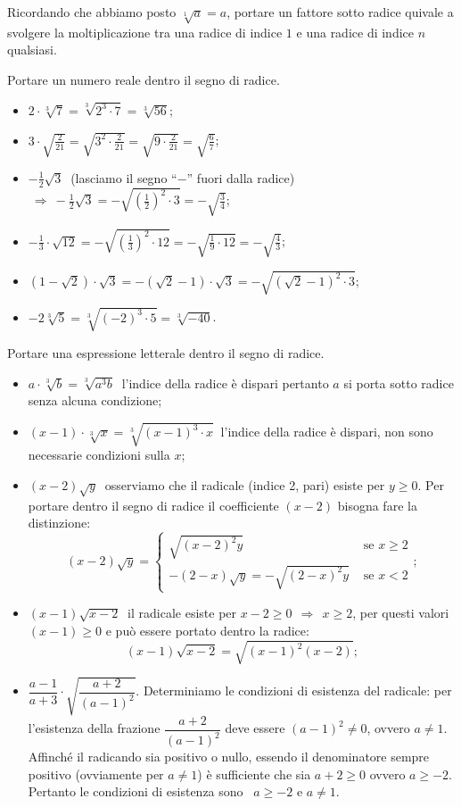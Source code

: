 Ricordando che abbiamo posto $\sqrt[1]a=a$, portare un fattore sotto radice quivale a svolgere la moltiplicazione tra una radice di indice $1$ e una radice di indice $n$ qualsiasi.
\begin{exrig}
 \begin{esempio}
 Portare un numero reale dentro il segno di radice.
 \begin{itemize}
 \item $2\cdot \sqrt[3]7=\sqrt[3]{2^3\cdot 7}=\sqrt[3]{56}$;
 \item $3\cdot \sqrt{\frac 2{21}}=\sqrt{3^2\cdot \frac 2{21}}=\sqrt{9\cdot \frac 2{21}}=\sqrt{\frac 6 7}$;
 \item $-\frac 1 2\sqrt 3\:$ (lasciamo il segno ``$-$'' fuori dalla radice) $\:\Rightarrow\:-\frac 1 2\sqrt 3=-\sqrt{\left(\frac 1 2\right)^2\cdot 3}=-\sqrt{\frac 3 4}$;
 \item $-\frac 1 3\cdot \sqrt{12}=-\sqrt{\left(\frac 1 3\right)^2\cdot 12}=-\sqrt{\frac 1 9\cdot 12}=-\sqrt{\frac 4 3}$;
 \item $\left(1-\sqrt 2\right)\cdot \sqrt 3=-	\left(\sqrt 2-1\right)\cdot \sqrt 3=-\sqrt{(\sqrt 2-1)^2\cdot 3}$;
 \item $-2\sqrt[3]5=\sqrt[3]{(-2)^3\cdot 5}=\sqrt[3]{-40}$.
 \end{itemize}
 \end{esempio}

 \begin{esempio}
 Portare una espressione letterale dentro il segno di radice.
 \begin{itemize}
 \item $a\cdot \sqrt[3]b=\sqrt[3]{a^3b}\:$ l'indice della radice è dispari pertanto $a$ si porta sotto radice senza alcuna condizione;
 \item $(x-1)\cdot \sqrt[3]x=\sqrt[3]{(x-1)^3\cdot x}\:$ l'indice della radice è dispari, non sono necessarie condizioni sulla $x$;
 \item $(x-2)\sqrt y\:$ osserviamo che il radicale (indice 2, pari) esiste per $y\ge 0$.
 Per portare dentro il segno di radice il coefficiente $(x-2)$ bisogna fare la distinzione:
 \[
 (x-2)\sqrt y=
 \begin{cases}
 \sqrt{(x-2)^2y} & \text{ se }x\ge 2\\
 -(2-x)\sqrt y=-\sqrt{(2-x)^2y} & \text{ se }x<2
 \end{cases};
 \]
 \item $(x-1)\sqrt{x-2}\:$ il radicale esiste per $x-2\ge 0\ \:\Rightarrow\: \ x\ge 2$, per questi valori $(x-1)\ge 0$ e può essere portato dentro la radice: \[(x-1)\sqrt{x-2}=\sqrt{(x-1)^2(x-2)};\]
 \item $\dfrac{a-1}{a+3}\cdot \sqrt{\dfrac{a+2}{(a-1)^2}}$. Determiniamo le condizioni di esistenza del radicale: per l'esistenza della frazione $\dfrac{a+2}{(a-1)^2}$ deve essere $(a-1)^2\neq 0$, ovvero $a\neq 1$. Affinché il radicando sia positivo o nullo, essendo il denominatore sempre positivo (ovviamente per $a\neq 1$) è sufficiente che sia $a+2\geqslant 0$ ovvero $a\geqslant -2$. Pertanto le condizioni di esistenza sono~ $a\geqslant -2$ e $a\neq 1$.


\end{itemize}
\end{esempio}
\end{exrig}
